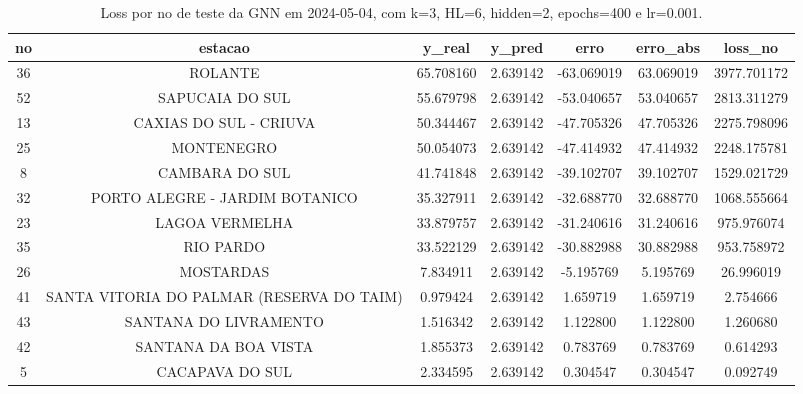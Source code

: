 \begin{table}[h]
\centering
\caption{Loss por no de teste da GNN em 2024-05-04, com k=3, HL=6, hidden=2, epochs=400 e lr=0.001.}
\label{tab:gnn_loss_k3_hl6_h2_e400_d20240504}
\begin{tabular}{ccccccc}
\toprule
no & estacao & y\_real & y\_pred & erro & erro\_abs & loss\_no \\
\midrule
36 & ROLANTE & 65.708160 & 2.639142 & -63.069019 & 63.069019 & 3977.701172 \\
52 & SAPUCAIA DO SUL & 55.679798 & 2.639142 & -53.040657 & 53.040657 & 2813.311279 \\
13 & CAXIAS DO SUL - CRIUVA & 50.344467 & 2.639142 & -47.705326 & 47.705326 & 2275.798096 \\
25 & MONTENEGRO & 50.054073 & 2.639142 & -47.414932 & 47.414932 & 2248.175781 \\
8 & CAMBARA DO SUL & 41.741848 & 2.639142 & -39.102707 & 39.102707 & 1529.021729 \\
32 & PORTO ALEGRE - JARDIM BOTANICO & 35.327911 & 2.639142 & -32.688770 & 32.688770 & 1068.555664 \\
23 & LAGOA VERMELHA & 33.879757 & 2.639142 & -31.240616 & 31.240616 & 975.976074 \\
35 & RIO PARDO & 33.522129 & 2.639142 & -30.882988 & 30.882988 & 953.758972 \\
26 & MOSTARDAS & 7.834911 & 2.639142 & -5.195769 & 5.195769 & 26.996019 \\
41 & SANTA VITORIA DO PALMAR (RESERVA DO TAIM) & 0.979424 & 2.639142 & 1.659719 & 1.659719 & 2.754666 \\
43 & SANTANA DO LIVRAMENTO & 1.516342 & 2.639142 & 1.122800 & 1.122800 & 1.260680 \\
42 & SANTANA DA BOA VISTA & 1.855373 & 2.639142 & 0.783769 & 0.783769 & 0.614293 \\
5 & CACAPAVA DO SUL & 2.334595 & 2.639142 & 0.304547 & 0.304547 & 0.092749 \\
\bottomrule
\end{tabular}
\end{table}
